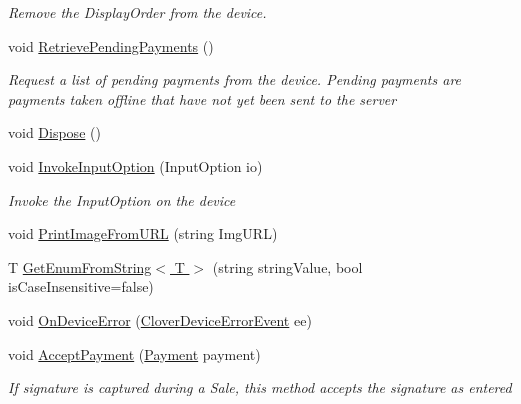 \begin{DoxyCompactItemize}
\begin{DoxyCompactList}\small\item\em Remove the Display\+Order from the device. \end{DoxyCompactList}\item 
void \hyperlink{classcom_1_1clover_1_1remotepay_1_1sdk_1_1_clover_connector_a8ba5ef9b937ad8edc9cd5052826da2ed}{Retrieve\+Pending\+Payments} ()
\begin{DoxyCompactList}\small\item\em Request a list of pending payments from the device. Pending payments are payments taken offline that have not yet been sent to the server \end{DoxyCompactList}\item 
void \hyperlink{classcom_1_1clover_1_1remotepay_1_1sdk_1_1_clover_connector_a08a821f3352e90d381bccb650f3078b5}{Dispose} ()
\item 
void \hyperlink{classcom_1_1clover_1_1remotepay_1_1sdk_1_1_clover_connector_a3dc88865e40a37997d2f593bf638512e}{Invoke\+Input\+Option} (Input\+Option io)
\begin{DoxyCompactList}\small\item\em Invoke the Input\+Option on the device \end{DoxyCompactList}\item 
void \hyperlink{classcom_1_1clover_1_1remotepay_1_1sdk_1_1_clover_connector_a5c19ccfff8c4f7ea04c426eb11b31a6a}{Print\+Image\+From\+U\+RL} (string Img\+U\+RL)
\item 
T \hyperlink{classcom_1_1clover_1_1remotepay_1_1sdk_1_1_clover_connector_aa2a0ec7354431592cb9d82e0c93fac45}{Get\+Enum\+From\+String$<$ T $>$} (string string\+Value, bool is\+Case\+Insensitive=false)
\item 
void \hyperlink{classcom_1_1clover_1_1remotepay_1_1sdk_1_1_clover_connector_a5bf3c2b75b879b1462d573d0fcbd1ce5}{On\+Device\+Error} (\hyperlink{classcom_1_1clover_1_1remotepay_1_1sdk_1_1_clover_device_error_event}{Clover\+Device\+Error\+Event} ee)
\item 
void \hyperlink{classcom_1_1clover_1_1remotepay_1_1sdk_1_1_clover_connector_afe33a1ba414608b2b05a3336128c7b5c}{Accept\+Payment} (\hyperlink{classcom_1_1clover_1_1sdk_1_1v3_1_1payments_1_1_payment}{Payment} payment)
\begin{DoxyCompactList}\small\item\em If signature is captured during a Sale, this method accepts the signature as entered \end{DoxyCompactList}\item 

\end{DoxyCompactItemize}
